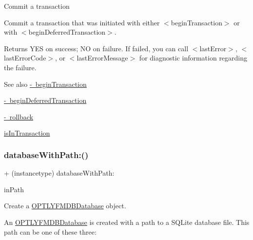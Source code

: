 Commit a transaction

Commit a transaction that was initiated with either {\ttfamily $<$begin\+Transaction$>$} or with {\ttfamily $<$begin\+Deferred\+Transaction$>$}.

\begin{DoxyReturn}{Returns}
{\ttfamily Y\+ES} on success; {\ttfamily NO} on failure. If failed, you can call {\ttfamily $<$last\+Error$>$}, {\ttfamily $<$last\+Error\+Code$>$}, or {\ttfamily $<$last\+Error\+Message$>$} for diagnostic information regarding the failure.
\end{DoxyReturn}
\begin{DoxySeeAlso}{See also}
\mbox{\hyperlink{interface_o_p_t_l_y_f_m_d_b_database_aa49b282394be0570adb7ae4b8544b6b5}{-\/ begin\+Transaction}} 

\mbox{\hyperlink{interface_o_p_t_l_y_f_m_d_b_database_ae42926b392d7862b8e4a2c7da6e12552}{-\/ begin\+Deferred\+Transaction}} 

\mbox{\hyperlink{interface_o_p_t_l_y_f_m_d_b_database_a511569a0ee0c82136255920ebe9d28e6}{-\/ rollback}} 

\mbox{\hyperlink{interface_o_p_t_l_y_f_m_d_b_database_aad9ac9a8b17ad02d9595a11567ceb404}{is\+In\+Transaction}} 
\end{DoxySeeAlso}
\mbox{\label{interface_o_p_t_l_y_f_m_d_b_database_a3828d13a7756446dca522294b569e0e7}} 
\subsubsection{\texorpdfstring{database\+With\+Path\+:()}{databaseWithPath:()}}
{\footnotesize\ttfamily + (instancetype) database\+With\+Path\+: \begin{DoxyParamCaption}\item[{(N\+S\+String $\ast$\+\_\+\+Nullable)}]{in\+Path }\end{DoxyParamCaption}}

Create a {\ttfamily \mbox{\hyperlink{interface_o_p_t_l_y_f_m_d_b_database}{O\+P\+T\+L\+Y\+F\+M\+D\+B\+Database}}} object.

An {\ttfamily \mbox{\hyperlink{interface_o_p_t_l_y_f_m_d_b_database}{O\+P\+T\+L\+Y\+F\+M\+D\+B\+Database}}} is created with a path to a S\+Q\+Lite database file. This path can be one of these three\+:


